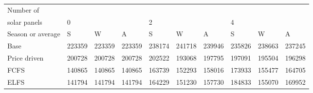 \begin{table}[h] 
\centering 
\begin{tabular}{l|lll|lll|lll}Number of \\ solar panels&0& & &2& & &4& & \\ \hline 
Season or average & S & W & A & S & W & A & S & W & A \\ \hline 
Base&223359&223359&223359&238174&241718&239946&235826&238663&237245 \\ 
Price driven&200728&200728&200728&202522&193068&197795&197091&195504&196298 \\ 
FCFS&140865&140865&140865&163739&152293&158016&173933&155477&164705 \\ 
ELFS&141794&141794&141794&164229&151230&157730&184833&155070&169952 \\ 
\end{tabular} 
\end{table}